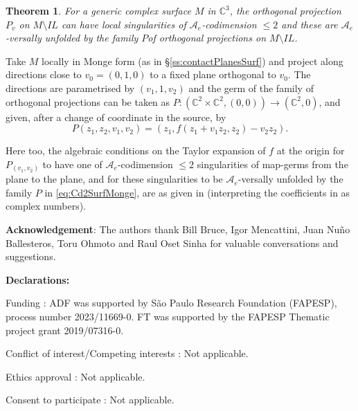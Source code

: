 \documentclass[12pt,a4paper]{article}
\newtheorem{theo}[prop]{Theorem}
\begin{document}
\begin{theo}\label{theo:CProSurf} 
	For a generic complex surface  $M$ in $\mathbb C^3$, the orthogonal projection 
	$P_v$ on $M\setminus IL$ can have local singularities 
	of $\mathcal A_e$-codimension $\le 2$ and these are $\mathcal A_e$-versally unfolded by the family $P$of orthogonal projections on $M\setminus IL$. 
	\end{theo} 


Take $M$ locally  in Monge form (as in \S\ref{ss:contactPlanesSurf}) and project along directions close to $v_0=(0,1,0)$ 
to a fixed plane orthogonal to $v_0$. The directions are parametrised by $(v_1,1,v_2)$ and 
the germ of the family of orthogonal projections  can be taken as 
$P:(\mathbb C^2\times   \mathbb C^2,(0,0))\to (\mathbb C^2,0)$, and given, after a change of coordinate in the source, by
\begin{equation}\label{eq:CProSurfMonge}
	P(z_1,z_2,v_1,v_2)=(z_1, f(z_1+v_1z_2,z_2)-v_2z_2).
\end{equation}

Here too, the algebraic conditions on the Taylor expansion of $f$ at the origin for $P_{(v_1,v_2)}$ to have one of $\mathcal A_e$-codimension $\le 2$ singularities of map-germs from the plane to the plane, and for these singularities to be $\mathcal A_e$-versally unfolded by the family $P$ in \eqref{eq:Cd2SurfMonge}, are as given in \cite[Chapter 6]{IRRT} (interpreting the coefficients in  \cite{IRRT} as complex numbers).

\vspace{0.5cm}

\noindent
{\bf Acknowledgement}:  
The authors thank Bill Bruce, Igor Mencattini, Juan Nuño Ballesteros, Toru Ohmoto and Raul Oset Sinha for valuable conversations and suggestions.


\vspace{0.5cm}
\noindent
\textbf{Declarations:}

\noindent
Funding : ADF was supported by São Paulo Research Foundation (FAPESP), process number 2023/11669-0.
FT was supported by the FAPESP Thematic project grant 2019/07316-0. 

\noindent
Conflict of interest/Competing interests : Not applicable.

\noindent
Ethics approval : Not applicable.

\noindent
Consent to participate : Not applicable.
\end{document}
